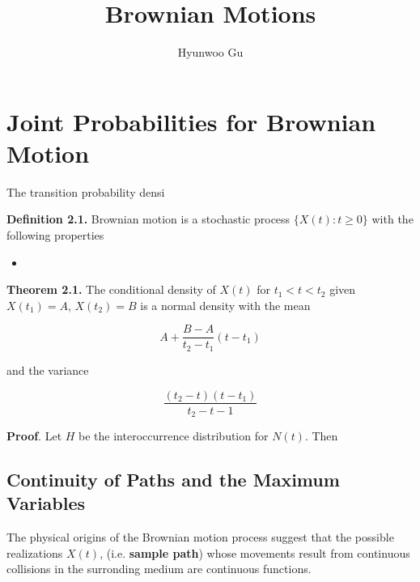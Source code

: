 \documentclass[12pt]{article}
\theoremstyle{nonumberbreak}
\begin{document}
\title{\textbf{Brownian Motions}}
\author{Hyunwoo Gu}
\date{}

\maketitle









\section{Joint Probabilities for Brownian Motion}

The transition probability densi

\begin{theorem}
\textbf{Definition 2.1.} Brownian motion is a stochastic process $\{ X(t) : t \ge 0 \}$ with the following properties

\begin{itemize}
	\item 
\end{itemize}


\end{theorem}



\begin{theorem}
\textbf{Theorem 2.1.} The conditional density of $X(t)$ for $t_1 < t < t_2$ given $X(t_1) = A$, $X(t_2) = B$ is a normal density with the mean

$$
A + \frac{B-A}{t_2 - t_1} (t - t_1)
$$

and the variance

$$
\frac{(t_2 - t) (t-t_1)}{ t_2 - t-1}
$$
\end{theorem}




\textbf{Proof}. Let $H$ be the interoccurrence distribution for $N(t)$. Then 


\subsection{Continuity of Paths and the Maximum Variables}

The physical origins of the Brownian motion process suggest that the possible realizations $X(t)$, (i.e. \textbf{sample path}) whose movements result from continuous collisions in the surronding medium are continuous functions. 
\end{document}
